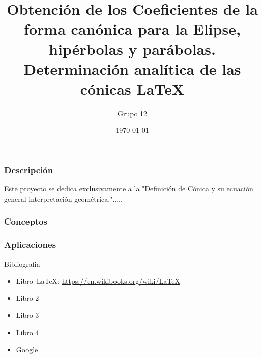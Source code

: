 \documentclass{beamer}
\title{Obtención de los Coeficientes de la forma canónica para la Elipse, hipérbolas y parábolas. \newline
Determinación analítica de las cónicas {\LaTeX}}
\author{Grupo 12}
\date{\today}
\begin{document}
\maketitle

\begin{frame}
    \frametitle{Descripción}
    Este proyecto se dedica exclusivamente a la "Definición de
    Cónica y su ecuación general interpretación geométrica.".....
\end{frame}

\begin{frame}
    \frametitle{Conceptos}
    \lipsum[1-1]
\end{frame}

\begin{frame}
    \frametitle{Aplicaciones}
    \lipsum[1-1]
\end{frame}

\begin{frame}{Bibliografia}
\begin{itemize}
    \item Libro~\LaTeX: \url{https://en.wikibooks.org/wiki/LaTeX}
    \item Libro 2
    \item Libro 3
    \item Libro 4
    \item \alert{Google}
\end{itemize}
\end{frame}
  
\end{document}

